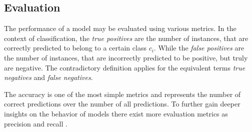 \subsection{Evaluation}\label{ord:ch2:sec1:subsec3}

The performance of a model may be evaluated using various metrics.
In the context of classification, the \textit{true positives} are the number of instances, that are correctly predicted to belong to a certain class $c_i$.
While the \textit{false positives} are the number of instances, that are incorrectly predicted to be positive, but truly are negative.
The contradictory definition applies for the equivalent terms \textit{true negatives} and \textit{false negatives}.

The accuracy is one of the most simple metrics and represents the number of correct predictions over the number of all predictions.
To further gain deeper insights on the behavior of models there exist more evaluation metrics as precision and recall \cite{Ger17-HandsOn}.

